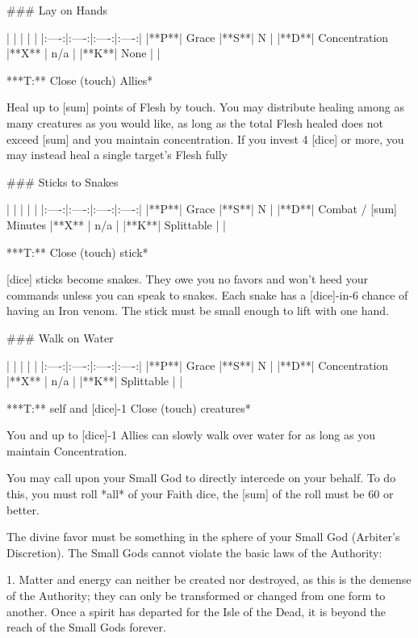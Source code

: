 ### Lay on Hands

| | | | |
|:----:|:----:|:----:|:----:|
|**P**| Grace |**S**|  N |
|**D**| Concentration |**X** |  n/a  |
|**K**| None | |


***T:**   Close (touch) Allies*



Heal up to [sum] points of Flesh by touch. You may distribute healing among as many creatures as you would like, as long as the total Flesh healed does not exceed [sum] and you maintain concentration. If you invest 4 [dice] or more, you may instead heal a single target's Flesh fully





### Sticks to Snakes

| | | | |
|:----:|:----:|:----:|:----:|
|**P**| Grace |**S**|  N |
|**D**| Combat / [sum] Minutes |**X** |  n/a  |
|**K**| Splittable | |


***T:**   Close (touch) stick*



[dice] sticks become snakes.  They owe you no favors and won't heed your commands unless you can speak to snakes.  Each snake has a [dice]-in-6 chance of having an Iron venom.  The stick must be small enough to lift with one hand. 





### Walk on Water

| | | | |
|:----:|:----:|:----:|:----:|
|**P**| Grace |**S**|  N |
|**D**| Concentration |**X** |  n/a  |
|**K**| Splittable | |


***T:**  self and [dice]-1 Close (touch) creatures*



You and up to [dice]-1 Allies can slowly walk over water for as long as you maintain Concentration. 








You may call upon your Small God to directly intercede on your behalf.  To do this, you must roll *all* of your Faith dice, the [sum] of the roll must be 60 or better.

The divine favor must be something in the sphere of your Small God (Arbiter's Discretion).  The Small Gods cannot violate the basic laws of the Authority:

1. Matter and energy can neither be created nor destroyed, as this is the demense of the Authority; they can only be transformed or changed from one form to another.  Once a spirit has departed for the Isle of the Dead, it is beyond the reach of the Small Gods forever. 

